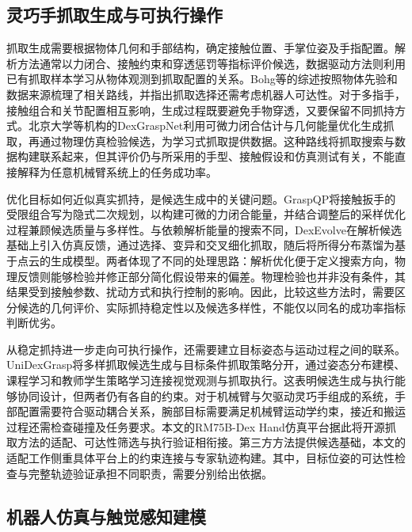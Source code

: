 \subsection{灵巧手抓取生成与可执行操作}
\label{subsec:grasp_generation_execution}

抓取生成需要根据物体几何和手部结构，确定接触位置、手掌位姿及手指配置。解析方法通常以力闭合、接触约束和穿透惩罚等指标评价候选，数据驱动方法则利用已有抓取样本学习从物体观测到抓取配置的关系。Bohg等的综述按照物体先验和数据来源梳理了相关路线，并指出抓取选择还需考虑机器人可达性\cite{bohg2014grasp}。对于多指手，接触组合和关节配置相互影响，生成过程既要避免手物穿透，又要保留不同抓持方式。北京大学等机构的DexGraspNet利用可微力闭合估计与几何能量优化生成抓取，再通过物理仿真检验候选，为学习式抓取提供数据\cite{wang2023dexgraspnet}。这种路线将抓取搜索与数据构建联系起来，但其评价仍与所采用的手型、接触假设和仿真测试有关，不能直接解释为任意机械臂系统上的任务成功率。

优化目标如何近似真实抓持，是候选生成中的关键问题。GraspQP将接触扳手的受限组合写为隐式二次规划，以构建可微的力闭合能量，并结合调整后的采样优化过程兼顾候选质量与多样性\cite{zurbrugg2025graspqp}。与依赖解析能量的搜索不同，DexEvolve在解析候选基础上引入仿真反馈，通过选择、变异和交叉细化抓取，随后将所得分布蒸馏为基于点云的生成模型\cite{zurbrugg2026dexevolve}。两者体现了不同的处理思路：解析优化便于定义搜索方向，物理反馈则能够检验并修正部分简化假设带来的偏差。物理检验也并非没有条件，其结果受到接触参数、扰动方式和执行控制的影响。因此，比较这些方法时，需要区分候选的几何评价、实际抓持稳定性以及候选多样性，不能仅以同名的成功率指标判断优劣。

从稳定抓持进一步走向可执行操作，还需要建立目标姿态与运动过程之间的联系。UniDexGrasp将多样抓取候选生成与目标条件抓取策略分开，通过姿态分布建模、课程学习和教师学生策略学习连接视觉观测与抓取执行\cite{xu2023unidexgrasp}。这表明候选生成与执行能够协同设计，但两者仍有各自的约束。对于机械臂与欠驱动灵巧手组成的系统，手部配置需要符合驱动耦合关系，腕部目标需要满足机械臂运动学约束，接近和搬运过程还需检查碰撞及任务要求。本文的RM75B-Dex Hand仿真平台据此将开源抓取方法的适配、可达性筛选与执行验证相衔接。第三方方法提供候选基础，本文的适配工作侧重具体平台上的约束连接与专家轨迹构建。其中，目标位姿的可达性检查与完整轨迹验证承担不同职责，需要分别给出依据。

\subsection{机器人仿真与触觉感知建模}
\label{subsec:simulation_tactile_modeling}


